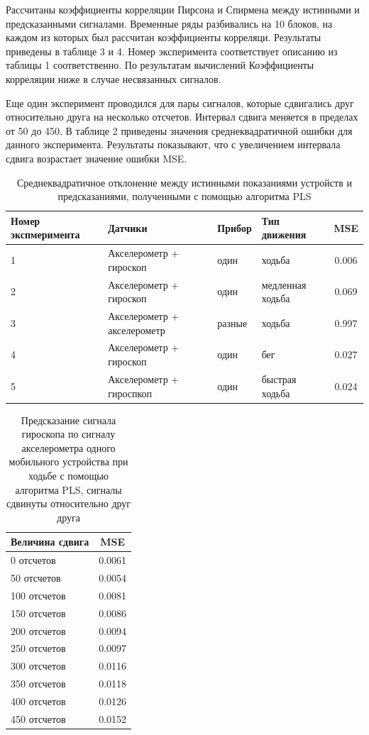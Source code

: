 \documentclass[12pt]{extarticle}
\begin{document}
Рассчитаны коэффициенты корреляции Пирсона и Спирмена между истинными и предсказанными сигналами.
Временные ряды разбивались на 10 блоков, на каждом из которых  был рассчитан коэффициенты корреляци. Результаты приведены в таблице 3 и 4. Номер эксперимента соответствует описанию из таблицы 1 соответственно. По результатам вычислений Коэффициенты корреляции ниже в случае несвязанных сигналов.

Еще один эксперимент проводился для пары сигналов, которые сдвигались друг относительно друга на несколько отсчетов. Интервал сдвига меняется в пределах от 50 до 450. В таблице 2 приведены значения среднеквадратичной ошибки для данного эксперимента. Результаты показывают, что с увеличением интервала сдвига возрастает значение ошибки MSE.


\begin{table}[bhtp]
	\centering
	\caption{Среднеквадратичное отклонение между истинными показаниями устройств и предсказаниями, полученными с помощью алгоритма PLS}
	\label{tbl:methods}
	\begin{tabular}{l|l|l|l|c}
		\hline
	Номер экспмеримента	& Датчики & Прибор & Тип движения & MSE \\
		\hline
	1 & Акселерометр + гироскоп & один & ходьба & 0.006 \\
	2 & Акселерометр + гироскоп & один & медленная ходьба & 0.069  \\
	3 &	Акселерометр + акселерометр & разные & ходьба & 0.997  \\
	4 &	Акселерометр + гироскоп & один & бег & 0.027  \\
	5 &	Акселерометр + гироспкоп & один & быстрая ходьба & 0.024  \\

		\hline   
	\end{tabular}
\end{table}

\begin{table}[bhtp]
	\centering
	\caption{Предсказание сигнала гироскопа по сигналу акселерометра одного мобильного устройства при ходьбе с помощью алгоритма PLS, сигналы сдвинуты относительно друг друга}
	\label{tbl:methods}
	\begin{tabular}{l|c}
		\hline
		Величина сдвига & MSE \\
		\hline
	    0 отсчетов & 0.0061 \\
		50 отсчетов & 0.0054  \\
		100 отсчетов & 0.0081  \\
		150 отсчетов & 0.0086  \\
		200 отсчетов & 0.0094  \\
		250 отсчетов & 0.0097  \\
		300 отсчетов & 0.0116   \\
		350 отсчетов & 0.0118  \\
		400 отсчетов & 0.0126  \\
		450 отсчетов & 0.0152  \\
		

		\hline   
	\end{tabular}
\end{table}
\end{document}

